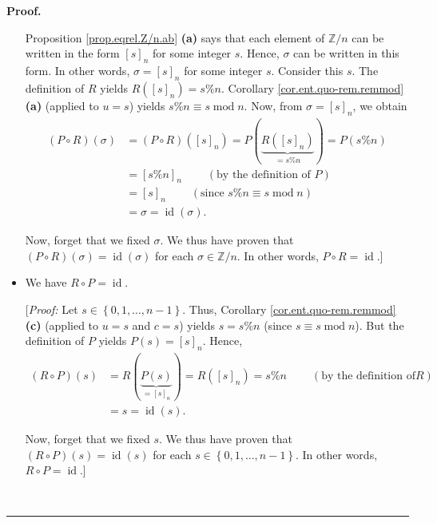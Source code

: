 \documentclass[numbers=enddot,12pt,final,onecolumn,notitlepage]{scrartcl}%
\numberwithin{exer}{subsection}
\theoremstyle{definition}
\newenvironment{proof}[1][Proof]{\noindent\textbf{#1.} }{\ \rule{0.5em}{0.5em}}
\begin{document}
\begin{proof}
\begin{itemize}
Proposition \ref{prop.eqrel.Z/n.ab} \textbf{(a)} says that each element of
$\mathbb{Z}/n$ can be written in the form $\left[  s\right]  _{n}$ for some
integer $s$. Hence, $\sigma$ can be written in this form. In other words,
$\sigma=\left[  s\right]  _{n}$ for some integer $s$. Consider this $s$. The
definition of $R$ yields $R\left(  \left[  s\right]  _{n}\right)  =s\%n$.
Corollary \ref{cor.ent.quo-rem.remmod} \textbf{(a)} (applied to $u=s$) yields
$s\%n\equiv s\operatorname{mod}n$. Now, from $\sigma=\left[  s\right]  _{n}$,
we obtain%
\begin{align*}
\left(  P\circ R\right)  \left(  \sigma\right)   &  =\left(  P\circ R\right)
\left(  \left[  s\right]  _{n}\right)  =P\left(  \underbrace{R\left(  \left[
s\right]  _{n}\right)  }_{=s\%n}\right)  =P\left(  s\%n\right) \\
&  =\left[  s\%n\right]  _{n}\ \ \ \ \ \ \ \ \ \ \left(  \text{by the
definition of }P\right) \\
&  =\left[  s\right]  _{n}\ \ \ \ \ \ \ \ \ \ \left(  \text{since }s\%n\equiv
s\operatorname{mod}n\right) \\
&  =\sigma=\operatorname*{id}\left(  \sigma\right)  .
\end{align*}


Now, forget that we fixed $\sigma$. We thus have proven that $\left(  P\circ
R\right)  \left(  \sigma\right)  =\operatorname*{id}\left(  \sigma\right)  $
for each $\sigma\in\mathbb{Z}/n$. In other words, $P\circ R=\operatorname*{id}%
$.]

\item We have $R\circ P=\operatorname*{id}$.

[\textit{Proof:} Let $s\in\left\{  0,1,\ldots,n-1\right\}  $. Thus, Corollary
\ref{cor.ent.quo-rem.remmod} \textbf{(c)} (applied to $u=s$ and $c=s$) yields
$s=s\%n$ (since $s\equiv s\operatorname{mod}n$). But the definition of $P$
yields $P\left(  s\right)  =\left[  s\right]  _{n}$. Hence,%
\begin{align*}
\left(  R\circ P\right)  \left(  s\right)   &  =R\left(  \underbrace{P\left(
s\right)  }_{=\left[  s\right]  _{n}}\right)  =R\left(  \left[  s\right]
_{n}\right)  =s\%n\ \ \ \ \ \ \ \ \ \ \left(  \text{by the definition of
}R\right) \\
&  =s=\operatorname*{id}\left(  s\right)  .
\end{align*}


Now, forget that we fixed $s$. We thus have proven that $\left(  R\circ
P\right)  \left(  s\right)  =\operatorname*{id}\left(  s\right)  $ for each
$s\in\left\{  0,1,\ldots,n-1\right\}  $. In other words, $R\circ
P=\operatorname*{id}$.]
\end{itemize}


\end{proof}
\end{document}
